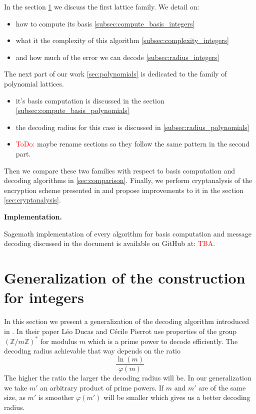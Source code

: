 \documentclass[12pt]{article}
\newcommand{\ZZ}{\mathbb{Z}}
\begin{document}
In the section \ref{sec:gen_integers} we discuss the first lattice family. We detail on:
\begin{itemize}
    \item how to compute its basis \ref{subsec:compute_basis_integers}
    \item what it the complexity of this algorithm \ref{subsec:complexity_integers}
    \item and how much of the error we can decode \ref{subsec:radius_integers}
\end{itemize}
The next part of our work \ref{sec:polynomials} is dedicated to the family of polynomial lattices.
\begin{itemize}
    \item it's basis computation is discussed in the section \ref{subsec:compute_basis_polynomials}
    \item the decoding radius for this case is discussed in \ref{subsec:radius_polynomials}
    \item \textcolor{red}{ToDo:} maybe rename sections so they follow the same pattern in the second part.
\end{itemize}
Then we compare these two families with respect to basis computation and decoding algorithms in \ref{sec:comparison}. Finally, we perform cryptanalysis of the encryption scheme presented in \cite{[LLXY17]} and propose improvements to it in the section \ref{sec:cryptanalysis}.

\textbf{Implementation.}

Sagemath implementation of every algorithm for basis computation and message decoding discussed in the document is available on GitHub at: \textcolor{red}{TBA}.



\section{Generalization of the construction for integers}
\label{sec:gen_integers}



In this section we present a generalization of the decoding algorithm introduced in \cite{[DP19]}. In their paper Léo Ducas and Cécile Pierrot use properties of the group $(\ZZ/m\ZZ)^*$ for modulus $m$ which is a prime power to decode efficiently. The decoding radius achievable that way depends on the ratio
\[
\frac{\ln(m)}{\varphi(m)}
\]
The higher the ratio the larger the decoding radius will be. In our generalization we take $m'$ an arbitrary product of prime powers. If $m$ and $m'$ are of the same size, as $m'$ is smoother $\varphi(m')$ will be smaller which gives us a better decoding radius.
\end{document}
